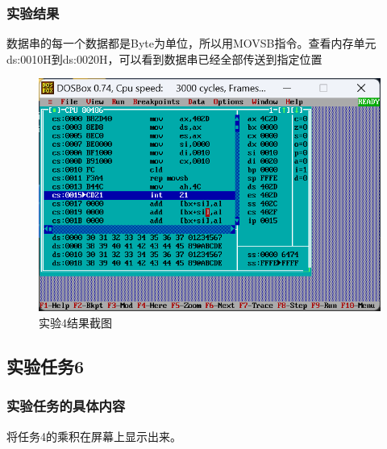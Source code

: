 \documentclass[12pt, a4paper, oneside]{ctexart}
\begin{document}
\subsubsection{实验结果}
数据串的每一个数据都是Byte为单位，所以用MOVSB指令。查看内存单元ds:0010H到ds:0020H，可以看到数据串已经全部传送到指定位置
\begin{figure}[H]
    \centering
    \includegraphics[scale=0.6]{pic/exp1_5.png}
    \caption{实验4结果截图}
\end{figure}

\subsection{实验任务6}
\subsubsection{实验任务的具体内容}
将任务4的乘积在屏幕上显示出来。
\end{document}
